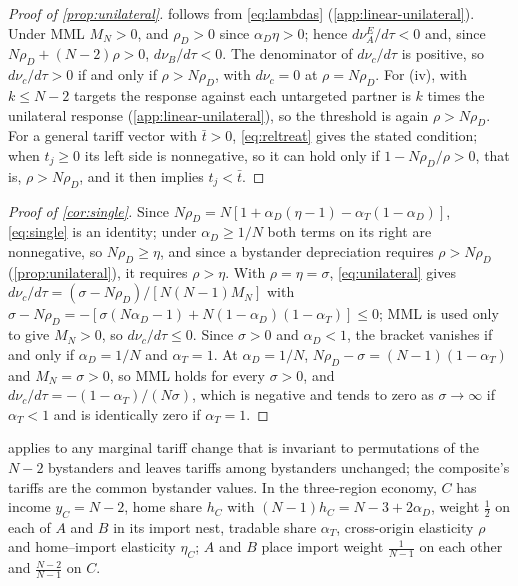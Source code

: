 \begin{proof}[Proof of \cref{prop:unilateral}]
 follows from \cref{eq:lambdas} (\cref{app:linear-unilateral}). Under MML $M_N>0$, and $\rho_D>0$ since $\alpha_D\eta>0$; hence $d\nu^E_A/d\tau<0$ and, since $N\rho_D+(N-2)\rho>0$, $d\nu_B/d\tau<0$. The denominator of $d\nu_c/d\tau$ is positive, so $d\nu_c/d\tau>0$ if and only if $\rho>N\rho_D$, with $d\nu_c=0$ at $\rho=N\rho_D$. For (iv), with $k\leq N-2$ targets the response against each untargeted partner is $k$ times the unilateral response (\cref{app:linear-unilateral}), so the threshold is again $\rho>N\rho_D$. For a general tariff vector with $\bar t>0$, \cref{eq:reltreat} gives the stated condition; when $t_j\geq0$ its left side is nonnegative, so it can hold only if $1-N\rho_D/\rho>0$, that is, $\rho>N\rho_D$, and it then implies $t_j<\bar t$.
\end{proof}

\begin{proof}[Proof of \cref{cor:single}]
Since $N\rho_D=N[1+\alpha_D(\eta-1)-\alpha_T(1-\alpha_D)]$, \cref{eq:single} is an identity; under $\alpha_D\geq1/N$ both terms on its right are nonnegative, so $N\rho_D\geq\eta$, and since a bystander depreciation requires $\rho>N\rho_D$ (\cref{prop:unilateral}), it requires $\rho>\eta$. With $\rho=\eta=\sigma$, \cref{eq:unilateral} gives $d\nu_c/d\tau=(\sigma-N\rho_D)/[N(N-1)M_N]$ with $\sigma-N\rho_D=-[\sigma(N\alpha_D-1)+N(1-\alpha_D)(1-\alpha_T)]\leq0$; MML is used only to give $M_N>0$, so $d\nu_c/d\tau\leq0$. Since $\sigma>0$ and $\alpha_D<1$, the bracket vanishes if and only if $\alpha_D=1/N$ and $\alpha_T=1$. At $\alpha_D=1/N$, $N\rho_D-\sigma=(N-1)(1-\alpha_T)$ and $M_N=\sigma>0$, so MML holds for every $\sigma>0$, and $d\nu_c/d\tau=-(1-\alpha_T)/(N\sigma)$, which is negative and tends to zero as $\sigma\to\infty$ if $\alpha_T<1$ and is identically zero if $\alpha_T=1$.
\end{proof}

 applies to any marginal tariff change that is invariant to permutations of the $N-2$ bystanders and leaves tariffs among bystanders unchanged; the composite's tariffs are the common bystander values. In the three-region economy, $C$ has income $y_C=N-2$, home share $h_C$ with $(N-1)h_C=N-3+2\alpha_D$, weight $\tfrac12$ on each of $A$ and $B$ in its import nest, tradable share $\alpha_T$, cross-origin elasticity $\rho$ and home--import elasticity $\eta_C$; $A$ and $B$ place import weight $\frac{1}{N-1}$ on each other and $\frac{N-2}{N-1}$ on $C$.

